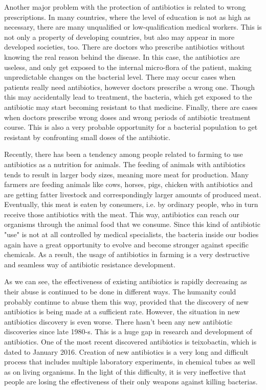 Another major problem with the protection of antibiotics is related to wrong prescriptions. In many countries, where the level of education is not as high as necessary, there are many unqualified or low-qualification medical workers. This is not only a property of developing countries, but also may appear in more developed societies, too. There are doctors who prescribe antibiotics without knowing the real reason behind the disease. In this case, the antibiotics are useless, and only get exposed to the internal micro-flora of the patient, making unpredictable changes on the bacterial level. There may occur cases when patients really need antibiotics, however doctors prescribe a wrong one. Though this may accidentally lead to treatment, the bacteria, which get exposed to the antibiotic may start becoming resistant to that medicine. Finally, there are cases when doctors prescribe wrong doses and wrong periods of antibiotic treatment course. This is also a very probable opportunity for a bacterial population to get resistant by confronting small doses of the antibiotic.

Recently, there has been a tendency among people related to farming to use antibiotics as a nutrition for animals. The feeding of animals with antibiotics tends to result in larger body sizes, meaning more meat for production. Many farmers are feeding animals like cows, horses, pigs, chicken with antibiotics and are getting fatter livestock and correspondingly larger amounts of produced meat. Eventually, this meat is eaten by consumers, i.e. by ordinary people, who in turn receive those antibiotics with the meat. This way, antibiotics can reach our organisms through the animal food that we consume. Since this kind of antibiotic "use" is not at all controlled by medical specialists, the bacteria inside our bodies again have a great opportunity to evolve and become stronger against specific chemicals. As a result, the usage of antibiotics in farming is a very destructive and seamless way of antibiotic resistance development.

As we can see, the effectiveness of existing antibiotics is rapidly decreasing as their abuse is continued to be done in different ways. The humanity could probably continue to abuse them this way, provided that the discovery of new antibiotics is being made at a sufficient rate. However, the situation in new antibiotics discovery is even worse. There hasn't been any new antibiotic discoveries since late 1980-s. This is a huge gap in research and development of antibiotics. One of the most recent discovered antibiotics is teixobactin, which is dated to January 2016. Creation of new antibiotics is a very long and difficult process that includes multiple laboratory experiments, in chemical tubes as well as on living organisms. In the light of this difficulty, it is very ineffective that people are losing the effectiveness of their only weapons against killing bacterias.

